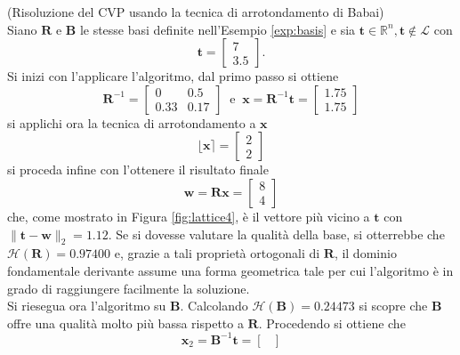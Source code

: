 \begin{exmp} (Risoluzione del CVP usando la tecnica di arrotondamento di Babai)
    \label{exp:babai}
    \\
    Siano $\mathbf{R}$ e $\mathbf{B}$ le stesse basi definite nell'Esempio \ref*{exp:basis} 
    e sia $\mathbf{t} \in \mathbb{R}^n, \mathbf{t} \notin \mathcal{L}$ con
    \[
        \mathbf{t} =
        \begin{bmatrix}
            7\\
            3.5
        \end{bmatrix}.
    \]
    Si inizi con l'applicare l'algoritmo, dal primo passo si ottiene
    \[
        \mathbf{R}^{-1} =
        \begin{bmatrix}
            0 & 0.5\\
            0.33 & 0.17
        \end{bmatrix}
        \ \text{ e } \ \mathbf{x} = \mathbf{R}^{-1}\mathbf{t} = 
        \begin{bmatrix}
            1.75\\
            1.75
        \end{bmatrix}
    \]
    si applichi ora la tecnica di arrotondamento a $\mathbf{x}$
    \[
        \lfloor\mathbf{x}\rceil = 
        \begin{bmatrix}
            2\\
            2
        \end{bmatrix}
    \]
    si proceda infine con l'ottenere il risultato finale
    \[
        \mathbf{w} = \mathbf{R}\mathbf{x} =
        \begin{bmatrix}
            8\\
            4
        \end{bmatrix}
    \]  
    che, come mostrato in Figura \ref{fig:lattice4}, è il vettore più vicino
    a $\mathbf{t}$ con $\|\mathbf{t}-\mathbf{w}\|_2 = 1.12$. Se si dovesse valutare la qualità della base, si otterrebbe che 
    $\mathcal{H}(\mathbf{R}) = 0.97400$ e, grazie a tali proprietà ortogonali di $\mathbf{R}$,
    il dominio fondamentale derivante assume una forma geometrica tale per cui
    l'algoritmo è in grado di raggiungere facilmente la soluzione.
    \\
    Si riesegua ora l'algoritmo su $\mathbf{B}$. Calcolando $\mathcal{H}(\mathbf{B}) = 0.24473$ 
    si scopre che $\mathbf{B}$ offre una qualità molto più bassa rispetto a $\mathbf{R}$. 
    Procedendo si ottiene che 
    \[
    \mathbf{x}_2 = \mathbf{B}^{-1}\mathbf{t}=
    \begin{bmatrix}

\end{bmatrix}\]
\end{exmp}
